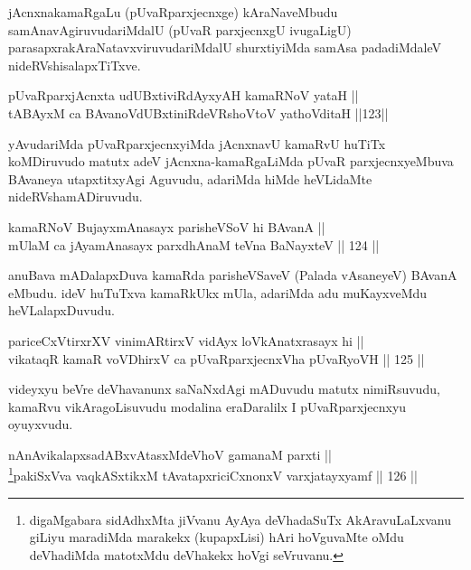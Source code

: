 \begin{artha}
jAcnxnakamaRgaLu (pUvaRparxjecnxge) kAraNaveMbudu
samAnavAgiruvudariMdalU (pUvaR parxjecnxgU ivugaLigU)
parasapxrakAraNatavxviruvudariMdalU shurxtiyiMda samAsa padadiMdaleV
nideRVshisalapxTiTxve.
\end{artha}

\begin{shl}
pUvaRparxjAcnxta udUBxtiviRdAyxyAH kamaRNoV yataH || \\
tABAyxM ca BAvanoVdUBxtiniRdeVRshoV\s toV yathoVditaH \hfill ||123||  
\end{shl}

\begin{artha}
yAvudariMda pUvaRparxjecnxyiMda jAcnxnavU kamaRvU huTiTx koMDiruvudo
matutx adeV jAcnxna-kamaRgaLiMda pUvaR parxjecnxyeMbuva BAvaneya
utapxtitxyAgi Aguvudu, adariMda hiMde heVLidaMte nideRVshamADiruvudu.
\end{artha}


\begin{shl}
kamaRNoV BujayxmAnasayx parisheVSoV hi BAvanA || \\
mUlaM ca jAyamAnasayx parxdhAnaM teVna BaNayxteV \hfill || 124 ||  
\end{shl}

\begin{artha}
anuBava mADalapxDuva kamaRda parisheVSaveV (Palada vAsaneyeV) BAvanA
eMbudu. ideV huTuTxva kamaRkUkx mUla, adariMda adu muKayxveMdu
heVLalapxDuvudu.
\end{artha}

\begin{shl}
pariceCxVtirxrXV vinimARtirxV vidAyx loVkAnatxrasayx hi || \\
vikataqR kamaR voVDhirxV ca pUvaRparxjecnxVha pUvaRyoVH \hfill || 125 ||  
\end{shl}	

\begin{artha}
videyxyu beVre deVhavanunx saNaNxdAgi mADuvudu matutx nimiRsuvudu,
kamaRvu vikAragoLisuvudu  modalina eraDaralilx I pUvaRparxjecnxyu
oyuyxvudu.
\end{artha}


\begin{shl}
nAnAvikalapxsadABxvAtasxMdeVhoV gamanaM parxti || \\
\footnote{digaMgabara sidAdhxMta jiVvanu AyAya deVhadaSuTx AkAravuLaLxvanu giLiyu maradiMda marakekx (kupapxLisi) hAri hoVguvaMte oMdu deVhadiMda matotxMdu deVhakekx hoVgi seVruvanu.}pakiSxVva vaqkASxtikxM tAvatapxriciCxnonxV varxjatayxyamf \hfill || 126 ||  
\end{shl}


